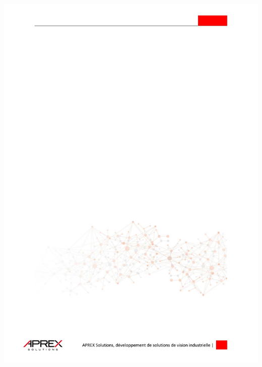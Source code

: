 {{  			\else \includegraphics[width = \paperwidth, height = \paperheight, keepaspectratio]{AXDoc/bg_all.pdf}
  			\fi}}

\pagestyle{fancy}
\renewcommand\headrulewidth{0pt}
\fancyhf{} 
\fancyfootoffset[R]{-0.35cm}
\fancyfoot[R]{\color{white}\vspace{-0.05cm}\textbf{\thepage}}
\fancyheadoffset[R]{-0.45cm}
\fancyhead[R]{\documentName \hspace{0.7cm}\textbf{\color{white}\docType}}



